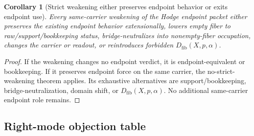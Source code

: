 \documentclass[11pt]{article}
\newtheorem{corollary}[theorem]{Corollary}
\begin{document}
\begin{corollary}[Strict weakening either preserves endpoint behavior or exits endpoint use]
Every same-carrier weakening of the Hodge endpoint packet either preserves the existing endpoint behavior extensionally, lowers empty fiber to raw/support/bookkeeping status, bridge-neutralizes into nonempty-fiber occupation, changes the carrier or readout, or reintroduces forbidden $D_{\mathrm{fib}}(X,p,\alpha)$.
\end{corollary}
\begin{proof}
If the weakening changes no endpoint verdict, it is endpoint-equivalent or bookkeeping.  If it preserves endpoint force on the same carrier, the no-strict-weakening theorem applies.  Its exhaustive alternatives are support/bookkeeping, bridge-neutralization, domain shift, or $D_{\mathrm{fib}}(X,p,\alpha)$.  No additional same-carrier endpoint role remains.
\end{proof}

\subsection{Right-mode objection table}
\end{document}
